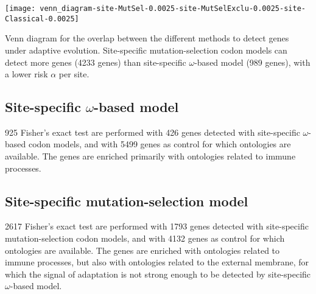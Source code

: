 \documentclass{article}
\renewcommand*{\bm}[1]{#1}%
\begin{document}
    \begin{center}
        \texttt{[image: venn\_diagram-site-MutSel-0.0025-site-MutSelExclu-0.0025-site-Classical-0.0025]}
    \end{center}
    Venn diagram for the overlap between the different methods to detect genes under adaptive evolution.
    Site-specific mutation-selection codon models can detect more genes (4233 genes) than site-specific $\omega$-based model (989 genes), with a lower risk $\alpha$ per site.

    \subsection{Site-specific $\bm{\omega}$-based model}
    \label{subsec:w-based-codon-method}
    925 Fisher's exact test are performed with 426 genes detected with site-specific $\omega$-based codon models, and with 5499 genes as control for which ontologies are available.
    The genes are enriched primarily with ontologies related to immune processes.

    \begin{center}
        \small
        
    \end{center}

    \subsection{Site-specific mutation-selection model}
    \label{subsec:mutation-selection-codon-method}

    2617 Fisher's exact test are performed with 1793 genes detected with site-specific mutation-selection codon models, and with 4132 genes as control for which ontologies are available.
    The genes are enriched with ontologies related to immune processes, but also with ontologies related to the external membrane, for which the signal of adaptation is not strong enough to be detected by site-specific $\omega$-based model.
\end{document}
